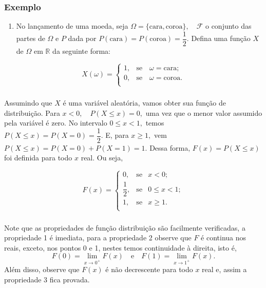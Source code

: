 \documentclass[14pt,aspectratio=1610]{beamer}
\begin{document}
\begin{frame}{}
\frametitle{Exemplo}
\begin{block}{}
\justifying

\begin{enumerate}
\item No lançamento de uma moeda, seja $\Omega=\{\textrm{cara}, \textrm{coroa}\},\quad \mathcal{F}$ o conjunto das partes de $\Omega$ e $P$ dada por $P(\textrm{cara})=P(\textrm{coroa})=\dfrac{1}{2}.$ Defina uma função $X$ de $\Omega$ em $\mathbb{R}$ da seguinte forma:
\end{enumerate}


$$
X(\omega)=\left\{
\begin{array}{ccc}
1,& \textrm{se}\quad \omega=\textrm{cara};\\
0,& \textrm{se}\quad \omega=\textrm{coroa}.\\
\end{array}
\right.
$$

\end{block}
\end{frame}

\begin{frame}{}
\frametitle{}
\begin{block}{}
\justifying
Assumindo que $X$ é uma variável aleatória, vamos obter sua função de distribuição.
Para $x<0, \quad P(X\leq x)=0,$ uma vez que o menor valor assumido pela variável é zero. No intervalo $0\leq x <1,$ temos $P(X\leq x)=P(X=0)=\dfrac{1}{2}.$ E, para 
$x\geq 1,$ vem $P(X\leq x)=P(X=0)+P(X=1)=1.$ Dessa forma, $F(x)=P(X\leq x)$ foi definida para todo $x$ real. Ou seja,

$$
F(x)=\left\{
\begin{array}{ccccc}
0,           & \textrm{se} & x<0     ;\\
\dfrac{1}{2},& \textrm{se} & 0\leq x<1;\\
1,           & \textrm{se} & x\geq 1 .\\
\end{array}
\right.
$$
\end{block}
\end{frame}

\begin{frame}{}
\frametitle{}
\begin{block}{}
\justifying
Note que as propriedades de função distribuição são facilmente verificadas, a propriedade 1 é imediata, para a propriedade 2 observe que $F$ é continua nos reais, 
exceto, nos pontos 0 e 1, nestes temos continuidade à direita, isto é, 
$${\displaystyle F(0)= \lim_{x \to 0^{+}}F(x)\quad \textrm{e}\quad 
                 F(1)= \lim_{x \to 1^{+}}F(x)}.$$ 
Além disso, observe que $F(x)$ é não decrescente para todo $x$ real e, assim a propriedade 3 fica provada.
\end{block}
\end{frame}
\end{document}
